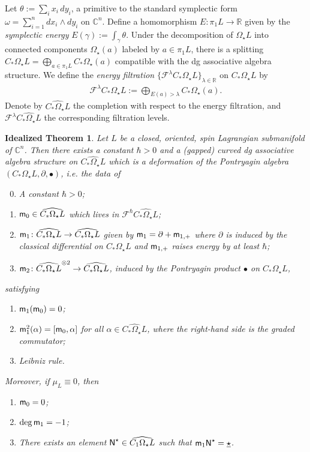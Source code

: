 \documentclass[10pt]{amsart}
\numberwithin{equation}{section}
\theoremstyle{plain}
\newtheorem{idealtheorem}[theorem]{Idealized Theorem}
\theoremstyle{definition}
\theoremstyle{remark}
\numberwithin{equation}{section}
\newcommand{\R}{\mathbb{R}}
\newcommand{\C}{\mathbb{C}}
\newcommand{\wh}[1]{\widehat{#1}}
\newcommand{\ms}[1]{\mathscr{#1}}
\newcommand{\mm}{\textup{\textsf{m}}}
\newcommand{\NN}{\textup{\textsf{N}}}
\begin{document}
Let $\theta:= \sum_i x_i\,dy_i$, a primitive to the standard symplectic form $\omega =\sum_{i=1}^n dx_i\wedge dy_i$ on $\C^n$.
Define a homomorphism $E\colon \pi_1 L\to \R$ given by the \emph{symplectic energy} $E(\gamma):= \int_\gamma \theta$.
Under the decomposition of $\Omega_\star L$ into connected components $\Omega_\star(a)$ labeled by $a\in \pi_1 L$, there is a splitting $C_*\Omega_\star L=\bigoplus_{a\in \pi_1 L} C_*\Omega_\star(a)$ compatible with the dg associative algebra structure.
We define the \emph{energy filtration} $\{\ms{F}^\lambda C_*\Omega_\star L\}_{\lambda \in \R}$ on $C_*\Omega_\star L$ by \begin{align*}
	\ms{F}^\lambda C_*\Omega_\star L := \bigoplus_{E(a)>\lambda} C_*\Omega_\star(a).
\end{align*}
Denote by $\wh{C_*\Omega_\star L}$ the completion with respect to the energy filtration, and $\ms{F}^\lambda \wh{C_*\Omega_\star L}$ the corresponding filtration levels.


\begin{idealtheorem}\label{IdealThm}
	Let $L$ be a closed, oriented, spin Lagrangian submanifold of $\C^n$. Then there exists a constant $\hbar>0$ and a (gapped) curved dg associative algebra structure on $\wh{C_*\Omega_\star L}$ which is a deformation of the Pontryagin algebra $(C_*\Omega_\star L,\partial, \bullet)$, i.e. the data of 
	\begin{enumerate}
  		\setcounter{enumi}{-1}
  		\item A constant $\hbar >0$;
		\item $\mm_0\in \wh{C_*\Omega_\star L}$ which lives in $\ms{F}^{\hbar} \wh{C_*\Omega_\star L}$;
		\item $\mm_1\colon \wh{C_*\Omega_\star L}\to \wh{C_*\Omega_\star L}$ given by $\mm_1=\partial +\mm_{1,+}$ where $\partial$ is induced by the classical differential on $C_*\Omega_\star L$ and $\mm_{1,+}$ raises energy by at least $\hbar$;
		\item $\mm_2\colon \wh{C_*\Omega_\star L}^{\otimes 2} \to \wh{C_*\Omega_\star L}$, induced by the Pontryagin product $\bullet$ on $C_*\Omega_\star L$,
	\end{enumerate}
	satisfying 
	\begin{enumerate}
		\item $\mm_1(\mm_0)=0$;
		\item $\mm_1^2(\alpha) = [\mm_0, \alpha]$ for all $\alpha \in \wh{C_*\Omega_\star L}$, where the right-hand side is the graded commutator;
		\item Leibniz rule.
	\end{enumerate}
	Moreover, if $\mu_L\equiv 0$, then 
	\begin{enumerate}
		\item $\mm_0 = 0$;
		\item $\deg \mm_1 = -1$;
		\item There exists an element $\NN^\star\in \wh{C_1\Omega_\star L}$ such that $\mm_1 \NN^\star = \underline{\star}$.
	\end{enumerate}
\end{idealtheorem}
\end{document}
